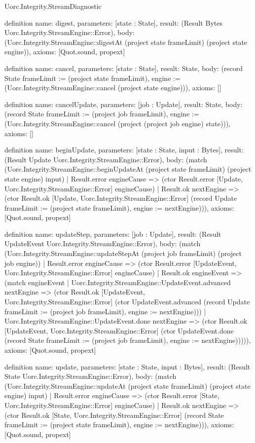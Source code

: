 \begin{lexlean}{Uorc.Integrity.StreamDiagnostic}
\begin{semanticmodule}
definition{
  name: digest,
  parameters: [state : State],
  result: (Result Bytes Uorc.Integrity.StreamEngine::Error),
  body: (Uorc.Integrity.StreamEngine::digestAt (project state frameLimit) (project state engine)),
  axioms: [Quot.sound, propext]
}

definition{
  name: cancel,
  parameters: [state : State],
  result: State,
  body: (record State {frameLimit := (project state frameLimit), engine := (Uorc.Integrity.StreamEngine::cancel (project state engine))}),
  axioms: []
}

definition{
  name: cancelUpdate,
  parameters: [job : Update],
  result: State,
  body: (record State {frameLimit := (project job frameLimit), engine := (Uorc.Integrity.StreamEngine::cancel (project (project job engine) state))}),
  axioms: []
}

definition{
  name: beginUpdate,
  parameters: [state : State, input : Bytes],
  result: (Result Update Uorc.Integrity.StreamEngine::Error),
  body: (match (Uorc.Integrity.StreamEngine::beginUpdateAt (project state frameLimit) (project state engine) input)
    | Result.error engineCause => (ctor Result.error [Update, Uorc.Integrity.StreamEngine::Error] engineCause)
    | Result.ok nextEngine => (ctor Result.ok [Update, Uorc.Integrity.StreamEngine::Error] (record Update {frameLimit := (project state frameLimit), engine := nextEngine}))),
  axioms: [Quot.sound, propext]
}

definition{
  name: updateStep,
  parameters: [job : Update],
  result: (Result UpdateEvent Uorc.Integrity.StreamEngine::Error),
  body: (match (Uorc.Integrity.StreamEngine::updateStepAt (project job frameLimit) (project job engine))
    | Result.error engineCause => (ctor Result.error [UpdateEvent, Uorc.Integrity.StreamEngine::Error] engineCause)
    | Result.ok engineEvent => (match engineEvent
      | Uorc.Integrity.StreamEngine::UpdateEvent.advanced nextEngine => (ctor Result.ok [UpdateEvent, Uorc.Integrity.StreamEngine::Error] (ctor UpdateEvent.advanced (record Update {frameLimit := (project job frameLimit), engine := nextEngine})))
      | Uorc.Integrity.StreamEngine::UpdateEvent.done nextEngine => (ctor Result.ok [UpdateEvent, Uorc.Integrity.StreamEngine::Error] (ctor UpdateEvent.done (record State {frameLimit := (project job frameLimit), engine := nextEngine}))))),
  axioms: [Quot.sound, propext]
}

definition{
  name: update,
  parameters: [state : State, input : Bytes],
  result: (Result State Uorc.Integrity.StreamEngine::Error),
  body: (match (Uorc.Integrity.StreamEngine::updateAt (project state frameLimit) (project state engine) input)
    | Result.error engineCause => (ctor Result.error [State, Uorc.Integrity.StreamEngine::Error] engineCause)
    | Result.ok nextEngine => (ctor Result.ok [State, Uorc.Integrity.StreamEngine::Error] (record State {frameLimit := (project state frameLimit), engine := nextEngine}))),
  axioms: [Quot.sound, propext]
}


\end{semanticmodule}
\end{lexlean}
